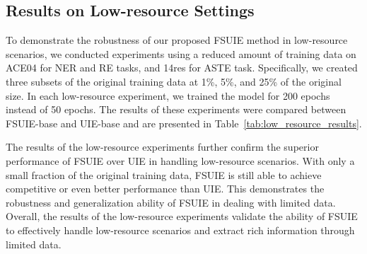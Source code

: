 \documentclass[11pt]{article}
\begin{document}
\subsection{Results on Low-resource Settings}




\begin{table}[]
    \caption{Experimental results on low-resource settings.}
    \label{tab:low_resource_results}
\end{table}

To demonstrate the robustness of our proposed FSUIE method in low-resource scenarios, we conducted experiments using a reduced amount of training data on ACE04 for NER and RE tasks, and 14res for ASTE task. Specifically, we created three subsets of the original training data at 1\%, 5\%, and 25\% of the original size. In each low-resource experiment, we trained the model for 200 epochs instead of 50 epochs. The results of these experiments were compared between FSUIE-base and UIE-base and are presented in Table~\ref{tab:low_resource_results}.


The results of the low-resource experiments further confirm the superior performance of FSUIE over UIE in handling low-resource scenarios. With only a small fraction of the original training data, FSUIE is still able to achieve competitive or even better performance than UIE. This demonstrates the robustness and generalization ability of FSUIE in dealing with limited data. Overall, the results of the low-resource experiments validate the ability of FSUIE to effectively handle low-resource scenarios and extract rich information through limited data.
\end{document}

